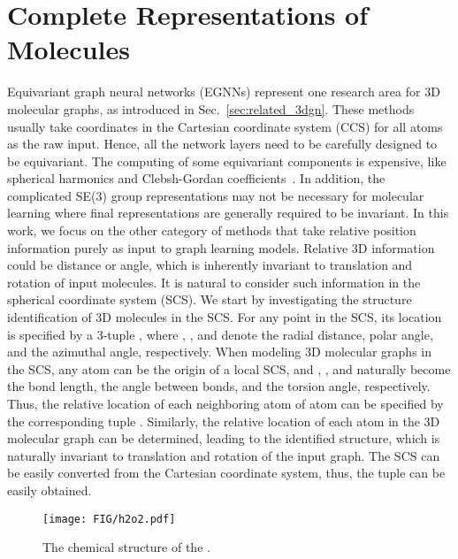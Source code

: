 \documentclass{article}
\begin{document}
\section{Complete Representations of Molecules} \label{sec:comp}
Equivariant graph neural networks (EGNNs) represent one research area for 3D molecular graphs,
as introduced in Sec.~\ref{sec:related_3dgn}.
\textcolor{COLOR}{These methods usually take coordinates in the Cartesian coordinate system (CCS) for
all atoms as the raw input.
Hence, all the network layers need to be carefully designed to be equivariant.
The computing of some equivariant components is expensive,
like spherical harmonics and Clebsh-Gordan coefficients~\citep{thomas2018tensor,fuchs2020se}.
In addition, the complicated SE(3) group representations may not be necessary for molecular learning where final representations are
generally required to be invariant.}
In this work, we focus on the other category of methods that take relative position information purely as input to graph learning models.
Relative 3D information could be distance or angle, which is inherently invariant to translation and rotation
of input molecules.
It is natural to consider such information in the spherical coordinate system (SCS).
We start by investigating the structure identification of 3D molecules
in the SCS.
For any point in the SCS, its location is specified 
by a 3-tuple ,
where , , and 
denote the radial distance, polar angle,
and the azimuthal angle, respectively.
When modeling 3D molecular graphs in the SCS,
any atom  can be the origin of a local SCS,
and , , and  naturally become
the bond length,
the angle between bonds,
and the torsion angle, respectively.
Thus, the relative location of each neighboring atom 
of atom  can be specified
by the corresponding tuple .
Similarly, the relative location of each atom
in the 3D molecular graph can be determined,
leading to the identified structure,
which is naturally invariant to translation and rotation of the input graph.
The SCS can be easily converted from the Cartesian coordinate system,
thus, the tuple  can be easily obtained.

\begin{wrapfigure}[9]{r}{0.45\textwidth}\vspace{-0.4 cm}
    \texttt{[image: FIG/h2o2.pdf]}
    \vspace{-25 pt}
    \caption{The chemical structure of the .
    }\label{fig:h2o2}
    \vspace{-10 pt}
\end{wrapfigure}
\end{document}
